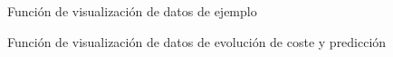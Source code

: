 \documentclass[6pt]{AiTex}
\begin{document}
\begin{figure}[H]
    \centering
    
    \caption{Función de visualización de datos de ejemplo}
    \label{fig:plot_ex_data}
\end{figure}

\begin{figure}[H]
    \centering
    
    \caption{Función de visualización de datos de evolución de coste y predicción}
    \label{fig:plot_linear_data}
\end{figure}
\end{document}

